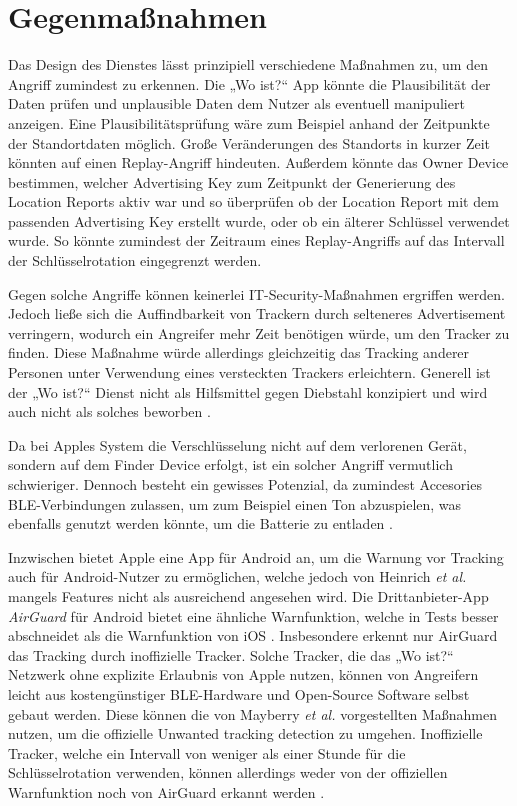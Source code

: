 \section{Gegenmaßnahmen}
\label{sec:Gegenmassnahmen}


Das Design des Dienstes lässt prinzipiell verschiedene Maßnahmen zu, um den Angriff zumindest zu erkennen.
Die „Wo ist?“ App könnte die Plausibilität der Daten prüfen und unplausible Daten dem Nutzer als eventuell manipuliert anzeigen.
Eine Plausibilitätsprüfung wäre zum Beispiel anhand der Zeitpunkte der Standortdaten möglich.
Große Veränderungen des Standorts in kurzer Zeit könnten auf einen Replay-Angriff hindeuten.
Außerdem könnte das Owner Device bestimmen, welcher Advertising Key zum Zeitpunkt der Generierung des Location Reports aktiv war und so überprüfen ob der Location Report mit dem passenden Advertising Key erstellt wurde, oder ob ein älterer Schlüssel verwendet wurde.
So könnte zumindest der Zeitraum eines Replay-Angriffs auf das Intervall der Schlüsselrotation eingegrenzt werden.


Gegen solche Angriffe können keinerlei IT-Security-Maßnahmen ergriffen werden.
Jedoch ließe sich die Auffindbarkeit von Trackern durch selteneres Advertisement verringern, wodurch ein Angreifer mehr Zeit benötigen würde, um den Tracker zu finden.
Diese Maßnahme würde allerdings gleichzeitig das Tracking anderer Personen unter Verwendung eines versteckten Trackers erleichtern.
Generell ist der „Wo ist?“ Dienst nicht als Hilfsmittel gegen Diebstahl konzipiert und wird auch nicht als solches beworben \cite{Apple_WoIst}.


Da bei Apples System die Verschlüsselung nicht auf dem verlorenen Gerät, sondern auf dem Finder Device erfolgt, ist ein solcher Angriff vermutlich schwieriger.
Dennoch besteht ein gewisses Potenzial, da zumindest Accesories \ac{BLE}-Verbindungen zulassen, um zum Beispiel einen Ton abzuspielen, was ebenfalls genutzt werden könnte, um die Batterie zu entladen \cite{Heinrich_AirGuard}.


Inzwischen bietet Apple eine App für Android an, um die Warnung vor Tracking auch für Android-Nutzer zu ermöglichen, welche jedoch von Heinrich \textit{et al.} \cite{Heinrich_AirGuard} mangels Features nicht als ausreichend angesehen wird.
Die Drittanbieter-App \textit{AirGuard} für Android bietet eine ähnliche Warnfunktion, welche in Tests besser abschneidet als die Warnfunktion von iOS \cite{Heinrich_AirGuard}.
Insbesondere erkennt nur AirGuard das Tracking durch inoffizielle Tracker.
Solche Tracker, die das „Wo ist?“ Netzwerk ohne explizite Erlaubnis von Apple nutzen, können von Angreifern leicht aus kostengünstiger \ac{BLE}-Hardware und Open-Source Software selbst gebaut werden.
Diese können die von Mayberry \textit{et al.} \cite{Mayberry_Tracking} vorgestellten Maßnahmen nutzen, um die offizielle Unwanted tracking detection zu umgehen.
Inoffizielle Tracker, welche ein Intervall von weniger als einer Stunde für die Schlüsselrotation verwenden, können allerdings weder von der offiziellen Warnfunktion noch von AirGuard erkannt werden \cite{Heinrich_AirGuard}.

